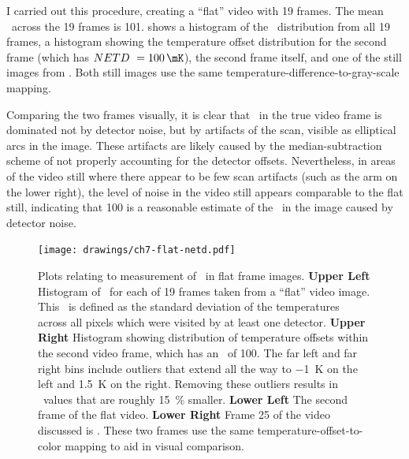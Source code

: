 I carried out this procedure, creating a ``flat'' video with 19 frames.
The mean \NETD\ across the 19 frames is \SI{101}{\mK}.
 shows a histogram of the \NETD\ distribution from all 19 frames, a histogram showing the temperature offset distribution for the second frame (which has $\NETD\ = \SI{100}{\mK}$), the second frame itself, and one of the still images from .
Both still images use the same temperature-difference-to-gray-scale mapping.

Comparing the two frames visually, it is clear that \NETD\ in the true video frame is dominated not by detector noise, but by artifacts of the scan, visible as elliptical arcs in the image.
These artifacts are likely caused by the median-subtraction scheme of  not properly accounting for the detector offsets.
Nevertheless, in areas of the video still where there appear to be few scan artifacts (such as the arm on the lower right), the level of noise in the video still appears comparable to the flat still, indicating that \SI{100}{\mK} is a reasonable estimate of the \NETD\ in the image caused by detector noise.

\begin{figure}
\centering
\texttt{[image: drawings/ch7-flat-netd.pdf]}
\caption[Plots relating to measurement of \NETD\ in flat frame images]{
  Plots relating to measurement of \NETD\ in flat frame images.
  \textbf{Upper Left} Histogram of \NETD\ for each of 19 frames taken from a ``flat'' video image. This \NETD\ is defined as the standard deviation of the temperatures across all pixels which were visited by at least one detector. 
  \textbf{Upper Right} Histogram showing distribution of temperature offsets within the second video frame, which has an \NETD\ of \SI{100}{\mK}.
                       The far left and far right bins include outliers that extend all the way to \SI{-1}{\K} on the left and \SI{1.5}{\K} on the right.
                       Removing these outliers results in \NETD\ values that are roughly \SI{15}{\percent} smaller.
  \textbf{Lower Left} The second frame of the flat video.
  \textbf{Lower Right} Frame 25 of the video discussed is .
These two frames use the same temperature-offset-to-color mapping to aid in visual comparison.
}
\label{fig:ch7-flat-netd}
\end{figure}


